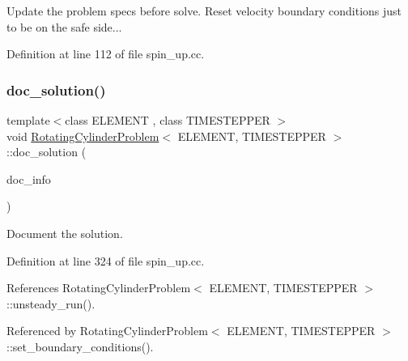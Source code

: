 Update the problem specs before solve. Reset velocity boundary conditions just to be on the safe side... 



Definition at line 112 of file spin\+\_\+up.\+cc.

\mbox{\label{classRotatingCylinderProblem_a22f82fba41d68b9748642f9a29a12592}} 
\subsubsection{\texorpdfstring{doc\+\_\+solution()}{doc\_solution()}}
{\footnotesize\ttfamily template$<$class E\+L\+E\+M\+E\+NT , class T\+I\+M\+E\+S\+T\+E\+P\+P\+ER $>$ \\
void \hyperlink{classRotatingCylinderProblem}{Rotating\+Cylinder\+Problem}$<$ E\+L\+E\+M\+E\+NT, T\+I\+M\+E\+S\+T\+E\+P\+P\+ER $>$\+::doc\+\_\+solution (\begin{DoxyParamCaption}\item[{Doc\+Info \&}]{doc\+\_\+info }\end{DoxyParamCaption})}



Document the solution. 



Definition at line 324 of file spin\+\_\+up.\+cc.



References Rotating\+Cylinder\+Problem$<$ E\+L\+E\+M\+E\+N\+T, T\+I\+M\+E\+S\+T\+E\+P\+P\+E\+R $>$\+::unsteady\+\_\+run().



Referenced by Rotating\+Cylinder\+Problem$<$ E\+L\+E\+M\+E\+N\+T, T\+I\+M\+E\+S\+T\+E\+P\+P\+E\+R $>$\+::set\+\_\+boundary\+\_\+conditions().

\mbox{\label{classRotatingCylinderProblem_a06a4c2a32a64bb6c0e6cf7a9e3bba157}} 
